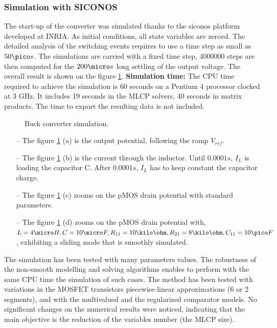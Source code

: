\subsubsection{Simulation with SICONOS}
 The start-up of the converter was simulated thanks to the {\sc siconos} platform
developed at INRIA. As initial conditions, all state variables are zeroed.
The detailed analysis of the switching events requires to use a time step as
small as $50 \pico s$. The simulations are carried with a fixed time step, 4000000 steps
are then computed for the $200 \micro s$ long settling of the output voltage.
The overall result is shown on the figure \ref{fig:figSimuBuck}.  
\vskip 0.2cm
{\bf Simulation time:} The CPU time required to achieve the simulation is 60 seconds on a
Pentium 4 processor clocked at 3 GHz. It includes 19 seconds in the MLCP solvers, 40 seconds in
matrix products. The time to export the resulting data is not included.
\begin{figure}[h]
  \centering
   \scalebox{0.6}{
  
  }
  \caption{Buck converter simulation.}
  \label{fig:figSimuBuck}
\end{figure}

\begin{enumerate}
  \item[--] The figure \ref{fig:figSimuBuck} (a) is the output potential, following the ramp $V_{ref}$.
    \item[--] The figure \ref{fig:figSimuBuck} (b) is the current through the inductor. Until $0.0001s$, $I_L$
    is loading the capacitor C. After $0.0001s$, $I_L$ has to keep constant the capacitor charge.
    \item[--] The figure \ref{fig:figSimuBuck} (c) zooms on the pMOS drain potential with standard
    parameters.
    \item[--] The figure  \ref{fig:figSimuBuck} (d) zooms on the pMOS drain potential with, $L=4\micro H,
    C=10\micro F,
    R_{11}=10\kilo \ohm, R_{21}=8\kilo \ohm ,C_{11}=10\pico F$, exhibiting a
    sliding mode that is smoothly simulated. 
  \end{enumerate}

The simulation has been tested with many parameters values. The robustness of the non-smooth modelling and solving algorithms enables to perform with the same CPU time the simulation of such cases. The method has been tested with variations in the MOSFET transistors piecewise-linear approximations (6 or 2 segments), and with the multivalued and the regularized comparator models. No significant changes on the numerical results were noticed, indicating that the main objective is the reduction of the variables number (the MLCP size).  



